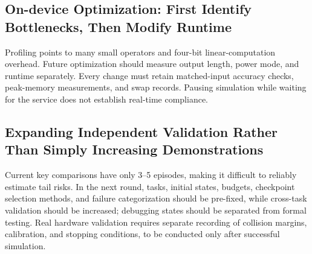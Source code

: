 \subsection{On-device Optimization: First Identify Bottlenecks, Then Modify Runtime}
Profiling points to many small operators and four-bit linear-computation overhead. Future optimization should measure output length, power mode, and runtime separately. Every change must retain matched-input accuracy checks, peak-memory measurements, and swap records. Pausing simulation while waiting for the service does not establish real-time compliance.
\subsection{Expanding Independent Validation Rather Than Simply Increasing Demonstrations}
Current key comparisons have only 3--5 episodes, making it difficult to reliably estimate tail risks. In the next round, tasks, initial states, budgets, checkpoint selection methods, and failure categorization should be pre-fixed, while cross-task validation should be increased; debugging states should be separated from formal testing. Real hardware validation requires separate recording of collision margins, calibration, and stopping conditions, to be conducted only after successful simulation.
